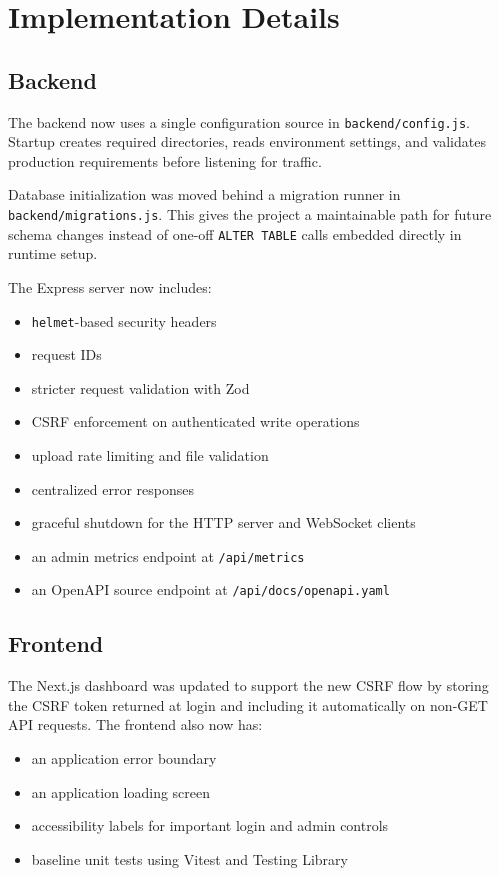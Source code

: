 \documentclass[12pt,a4paper]{report}
\begin{document}
\chapter{Implementation Details}

\section{Backend}

The backend now uses a single configuration source in \texttt{backend/config.js}. Startup creates required directories, reads environment settings, and validates production requirements before listening for traffic.

Database initialization was moved behind a migration runner in \texttt{backend/migrations.js}. This gives the project a maintainable path for future schema changes instead of one-off \texttt{ALTER TABLE} calls embedded directly in runtime setup.

The Express server now includes:

\begin{itemize}
  \item \texttt{helmet}-based security headers
  \item request IDs
  \item stricter request validation with Zod
  \item CSRF enforcement on authenticated write operations
  \item upload rate limiting and file validation
  \item centralized error responses
  \item graceful shutdown for the HTTP server and WebSocket clients
  \item an admin metrics endpoint at \texttt{/api/metrics}
  \item an OpenAPI source endpoint at \texttt{/api/docs/openapi.yaml}
\end{itemize}

\section{Frontend}

The Next.js dashboard was updated to support the new CSRF flow by storing the CSRF token returned at login and including it automatically on non-GET API requests. The frontend also now has:

\begin{itemize}
  \item an application error boundary
  \item an application loading screen
  \item accessibility labels for important login and admin controls
  \item baseline unit tests using Vitest and Testing Library
\end{itemize}
\end{document}
